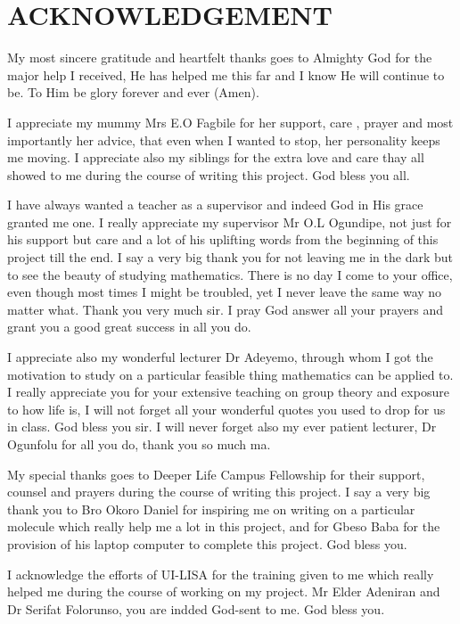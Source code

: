 \documentclass[a4paper, 12pt, openany]{report}
\begin{document}
\section*{ACKNOWLEDGEMENT}
My most sincere gratitude and heartfelt thanks goes to Almighty God for the major help I received, He has helped me this far and I know He will continue to be. To Him be glory forever and ever (Amen).

I appreciate my mummy Mrs E.O Fagbile for her support, care , prayer and most importantly her advice, that even when I wanted to stop, her personality keeps me moving. I appreciate also my siblings for the extra love and care thay all showed to me during the course of writing this project. God bless you all.

 I have always wanted a teacher as a supervisor and indeed God in His grace granted me one. I really appreciate my supervisor Mr O.L Ogundipe, not just for his support but care and a lot of his uplifting words from the beginning of this project till the end. I say a very big thank you for not  leaving me in the dark but to see the beauty of studying mathematics. There is no day I come to your office, even though most times I might be troubled, yet I never leave the same way no matter what. Thank you very much sir. I pray God answer all your prayers and grant you a good great success in all you do.
 
 I appreciate also my wonderful lecturer Dr Adeyemo, through whom I got the motivation to study on a particular feasible thing mathematics can be applied to. I really appreciate you for your extensive teaching on group theory and exposure to how life is, I will not forget all your wonderful quotes you used to drop for us in class. God bless you sir. I will never forget also my ever patient lecturer, Dr Ogunfolu for all you do, thank you so much ma.
 
 My special thanks goes to Deeper Life Campus Fellowship for their \break support, counsel and prayers during the course of writing this project. I say a very big thank you to Bro Okoro Daniel for inspiring me on writing on a particular molecule which really help me a lot in this project, and for Gbeso Baba for the provision of his laptop computer to complete this project. God bless you.
 
 I acknowledge the efforts of UI-LISA for the training given to me which really helped me during the course of working on my project. Mr Elder Adeniran and Dr Serifat Folorunso, you are indded God-sent to me. God bless you.
 
\end{document}
